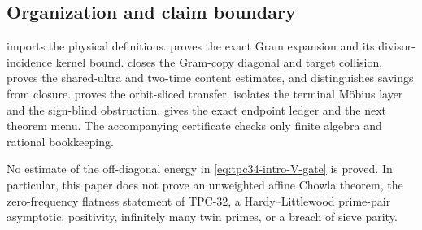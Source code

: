 \subsection{Organization and claim boundary}

 imports the physical definitions.
 proves the exact Gram expansion and its
divisor-incidence kernel bound.  
closes the Gram-copy diagonal and target collision, proves the shared-ultra and
two-time content estimates, and distinguishes savings from closure.
 proves the orbit-sliced transfer.
 isolates the terminal M\"obius layer and
the sign-blind obstruction.   gives the exact
endpoint ledger and the next theorem menu.  The accompanying certificate
checks only finite algebra and rational bookkeeping.

No estimate of the off-diagonal energy in
\eqref{eq:tpc34-intro-V-gate} is proved.  In particular, this paper does
not prove an unweighted affine Chowla theorem, the zero-frequency
flatness statement of TPC-32, a Hardy--Littlewood prime-pair asymptotic,
positivity, infinitely many twin primes, or a breach of sieve parity.
